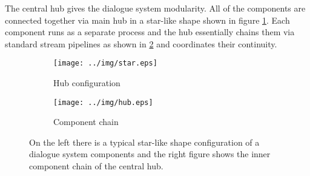 The central hub gives the dialogue system modularity.
All of the components are connected together via main hub in a star-like shape shown in figure \ref{fig:hub}.
Each component runs as a separate process and the hub essentially chains them via standard stream pipelines as shown in \ref{fig:chain} and coordinates their continuity.


\begin{figure}[ht]
\centering
\begin{subfigure}{0.5\textwidth}
  \centering
  \texttt{[image: ../img/star.eps]}
  \caption{Hub configuration}
  \label{fig:hub}
\end{subfigure}%
\begin{subfigure}{0.5\textwidth}
  \centering
  \texttt{[image: ../img/hub.eps]}
  \caption{Component chain}
  \label{fig:chain}
\end{subfigure}
\caption{On the left there is a typical star-like shape configuration of a dialogue system components and the right figure shows the inner component chain of the central hub.} %
\label{fig:test}
\end{figure}
